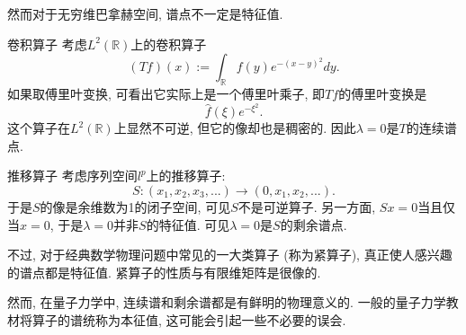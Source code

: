 然而对于无穷维巴拿赫空间, 谱点不一定是特征值.

\begin{example}{卷积算子}
考虑$L^2(\mathbb{R})$上的卷积算子
$$
(Tf)(x):=\int_{\mathbb{R}}f(y)e^{-(x-y)^2}dy.
$$
如果取傅里叶变换, 可看出它实际上是一个傅里叶乘子, 即$Tf$的傅里叶变换是
$$
\hat f(\xi)e^{-\xi^2}.
$$
这个算子在$L^2(\mathbb{R})$上显然不可逆, 但它的像却也是稠密的. 因此$\lambda=0$是$T$的连续谱点.
\end{example}

\begin{example}{推移算子}
考虑序列空间$l^p$上的推移算子:
$$
S:(x_1,x_2,x_3,...)\to(0,x_1,x_2,...).
$$
于是$S$的像是余维数为1的闭子空间, 可见$S$不是可逆算子. 另一方面, $Sx=0$当且仅当$x=0$, 于是$\lambda=0$并非$S$的特征值. 可见$\lambda=0$是$S$的剩余谱点.
\end{example}

不过, 对于经典数学物理问题中常见的一大类算子 (称为紧算子), 真正使人感兴趣的谱点都是特征值. 紧算子的性质与有限维矩阵是很像的.

然而, 在量子力学中, 连续谱和剩余谱都是有鲜明的物理意义的. 一般的量子力学教材将算子的谱统称为本征值, 这可能会引起一些不必要的误会.